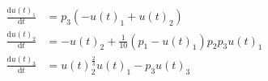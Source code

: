 \begin{align}
\frac{\mathrm{d} u\left( t \right)_{1}}{\mathrm{d}t} &= p_{3} \left(  - u\left( t \right)_{1} + u\left( t \right)_{2} \right) \\
\frac{\mathrm{d} u\left( t \right)_{2}}{\mathrm{d}t} &=  - u\left( t \right)_{2} + \frac{1}{10} \left( p_{1} - u\left( t \right)_{1} \right) p_{2} p_{3} u\left( t \right)_{1} \\
\frac{\mathrm{d} u\left( t \right)_{3}}{\mathrm{d}t} &= u\left( t \right)_{2}^{\frac{2}{3}} u\left( t \right)_{1} - p_{3} u\left( t \right)_{3}
\end{align}
